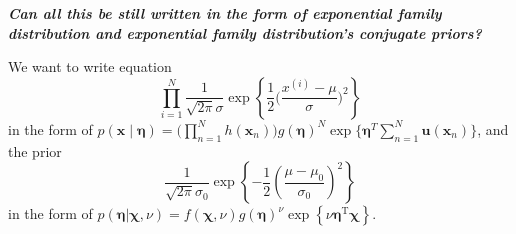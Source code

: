 \documentclass[12pt]{article}
\begin{document}
\textbf{\emph{Can all this be still written in the form of exponential family distribution and exponential family distribution's conjugate priors?}}

We want to write equation
\begin{displaymath}
\prod_{i=1}^{N}\frac{1}{\sqrt{2\pi}\sigma}\exp\left\{\frac{1}{2}\Big(\frac{x^{(i)}-\mu}{\sigma}\Big)^2\right\}
\end{displaymath} in the form of $p(\textbf{x}\mid\bm{\eta})=\Big(\prod_{n=1}^{N}h(\textbf{x}_n)\Big)g(\bm{\eta})^{N}\exp\Big\{\bm{\eta}^T\sum_{n=1}^{N}\textbf{u}(\textbf{x}_n)\Big\}$, and the prior
$$\frac{1}{\sqrt{2 \pi} \sigma_{0}} \exp \left\{-\frac{1}{2}\left(\frac{\mu-\mu_{0}}{\sigma_{0}}\right)^{2}\right\}$$ in the form of $p(\boldsymbol{\eta} | \boldsymbol{\chi}, \nu)=f(\boldsymbol{\chi}, \nu) g(\boldsymbol{\eta})^{\nu} \exp \left\{\nu \boldsymbol{\eta}^{\mathrm{T}} \boldsymbol{\chi}\right\}$.
\end{document}
